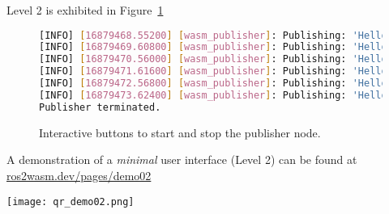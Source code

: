         Level 2 is exhibited in Figure~\ref{fig:ui2}

        \begin{figure}[htbp]
            \centering
            \begin{lstlisting}[language=Bash]
[INFO] [16879468.55200] [wasm_publisher]: Publishing: 'Hello there! 13'
[INFO] [16879469.60800] [wasm_publisher]: Publishing: 'Hello there! 14'
[INFO] [16879470.56000] [wasm_publisher]: Publishing: 'Hello there! 15'
[INFO] [16879471.61600] [wasm_publisher]: Publishing: 'Hello there! 16'
[INFO] [16879472.56800] [wasm_publisher]: Publishing: 'Hello there! 17'
[INFO] [16879473.62400] [wasm_publisher]: Publishing: 'Hello there! 18'
Publisher terminated.\end{lstlisting}
            \caption{Interactive buttons to start and stop the publisher node.}\label{fig:ui2}
        \end{figure}

        \begin{tcolorbox}[title=Example 2]
            \begin{minipage}[t]{0.87\linewidth}
                \vspace*{0.5\baselineskip}
                A demonstration of a \textit{minimal} user interface (Level 2) can
                be found at \href{https://ros2wasm.dev/pages/demo02/index.html}{\textsf{ros2wasm.dev/pages/demo02}}
            \end{minipage}\hfill%
            \begin{minipage}[t]{0.1\linewidth}
                \vspace*{0pt}
                \texttt{[image: qr\_demo02.png]}
            \end{minipage}
        \end{tcolorbox}

